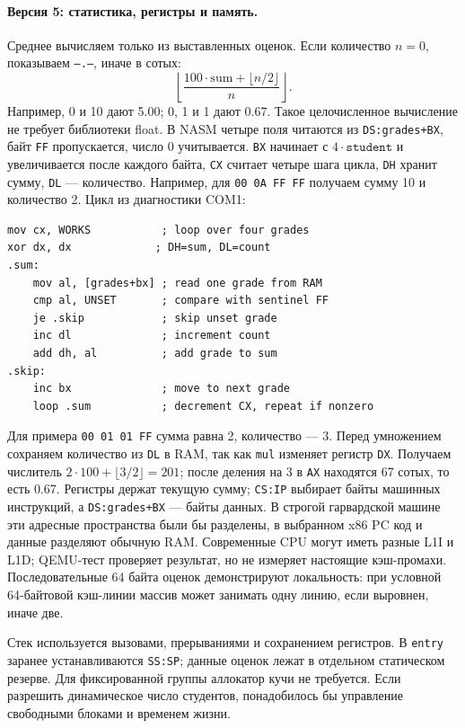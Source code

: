 \paragraph{Версия 5: статистика, регистры и память.}
Среднее вычисляем только из выставленных оценок. Если количество $n=0$,
показываем \texttt{--.--}, иначе в сотых:
\[
\left\lfloor\frac{100\cdot\mathrm{sum}+\lfloor n/2\rfloor}{n}\right\rfloor.
\]
Например, 0 и 10 дают 5.00; 0, 1 и 1 дают 0.67. Такое целочисленное
вычисление не требует библиотеки float. В NASM четыре поля читаются
из \texttt{DS:grades+BX}, байт \texttt{FF} пропускается, число 0
учитывается. \texttt{BX} начинает с $4\cdot\texttt{student}$ и увеличивается
после каждого байта, \texttt{CX} считает четыре шага цикла, \texttt{DH}
хранит сумму, \texttt{DL} --- количество. Например, для
\texttt{00 0A FF FF} получаем сумму 10 и количество 2.
Цикл из диагностики COM1:
\begin{lstlisting}[basicstyle=\ttfamily\small]
mov cx, WORKS           ; loop over four grades
xor dx, dx             ; DH=sum, DL=count
.sum:
    mov al, [grades+bx] ; read one grade from RAM
    cmp al, UNSET       ; compare with sentinel FF
    je .skip            ; skip unset grade
    inc dl              ; increment count
    add dh, al          ; add grade to sum
.skip:
    inc bx              ; move to next grade
    loop .sum           ; decrement CX, repeat if nonzero
\end{lstlisting}
Для примера \texttt{00 01 01 FF} сумма равна 2, количество --- 3.
Перед умножением сохраняем количество из \texttt{DL} в RAM, так как
\texttt{mul} изменяет регистр \texttt{DX}. Получаем числитель
$2\cdot100+\lfloor3/2\rfloor=201$; после деления на 3 в
\texttt{AX} находятся 67 сотых, то есть 0.67.
Регистры держат текущую сумму; \texttt{CS:IP} выбирает байты машинных
инструкций, а \texttt{DS:grades+BX} --- байты данных. В строгой гарвардской
машине эти адресные пространства были бы разделены, в выбранном x86 PC
код и данные разделяют обычную RAM. Современные CPU могут иметь разные
L1I и L1D; QEMU-тест проверяет результат, но не измеряет настоящие
кэш-промахи. Последовательные 64 байта оценок демонстрируют локальность:
при условной 64-байтовой кэш-линии массив может занимать одну линию,
если выровнен, иначе две.

Стек используется вызовами, прерываниями и сохранением регистров.
В \texttt{entry} заранее устанавливаются \texttt{SS:SP}; данные оценок
лежат в отдельном статическом резерве. Для фиксированной группы
аллокатор кучи не требуется. Если разрешить динамическое число студентов,
понадобилось бы управление свободными блоками и временем жизни.

